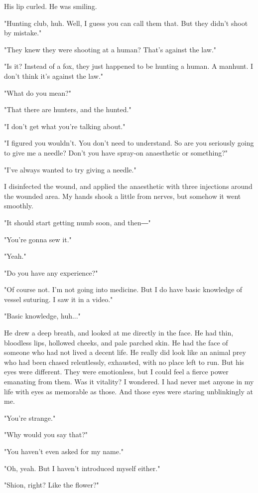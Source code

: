 His lip curled. He was smiling.

"Hunting club, huh. Well, I guess you can call them that. But they
didn't shoot by mistake."

"They knew they were shooting at a human? That's against the law."

"Is it? Instead of a fox, they just happened to be hunting a human. A
manhunt. I don't think it's against the law."

"What do you mean?"

"That there are hunters, and the hunted."

"I don't get what you're talking about."

"I figured you wouldn't. You don't need to understand. So are you
seriously going to give me a needle? Don't you have spray-on anaesthetic
or something?"

"I've always wanted to try giving a needle."

I disinfected the wound, and applied the anaesthetic with three
injections around the wounded area. My hands shook a little from nerves,
but somehow it went smoothly.

"It should start getting numb soon, and then―"

"You're gonna sew it."

"Yeah."

"Do you have any experience?"

"Of course not. I'm not going into medicine. But I do have basic
knowledge of vessel suturing. I saw it in a video."

"Basic knowledge, huh..."

He drew a deep breath, and looked at me directly in the face. He had
thin, bloodless lips, hollowed cheeks, and pale parched skin. He had the
face of someone who had not lived a decent life. He really did look like
an animal prey who had been chased relentlessly, exhausted, with no
place left to run. But his eyes were different. They were emotionless,
but I could feel a fierce power emanating from them. Was it vitality? I
wondered. I had never met anyone in my life with eyes as memorable as
those. And those eyes were staring unblinkingly at me.

"You're strange."

"Why would you say that?"

"You haven't even asked for my name."

"Oh, yeah. But I haven't introduced myself either."

"Shion, right? Like the flower?"

